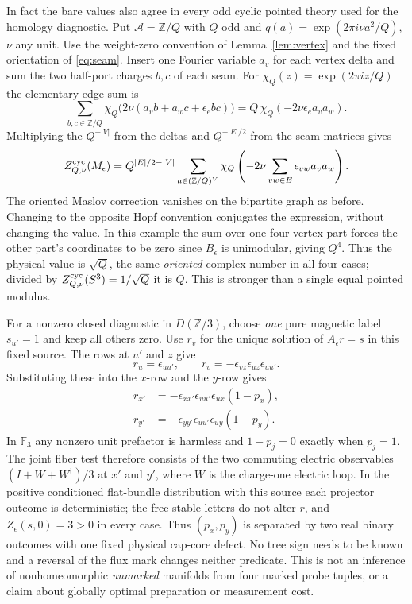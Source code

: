 \documentclass[11pt]{article}
\newcommand{\F}{\mathbb F_3}
\newcommand{\Z}{\mathbb Z}
\begin{document}
In fact the bare values also agree in every odd cyclic pointed theory used for the homology diagnostic. Put \(\mathcal A=\Z/Q\) with \(Q\) odd and \(q(a)=\exp(2\pi i \nu a^2/Q)\), \(\nu\) any unit. Use the weight-zero convention of Lemma~\ref{lem:vertex} and the fixed orientation of \eqref{eq:seam}. Insert one Fourier variable \(a_v\) for each vertex delta and sum the two half-port charges \(b,c\) of each seam. For \(\chi_Q(z)=\exp(2\pi i z/Q)\) the elementary edge sum is
\[
 \sum_{b,c\in\Z/Q}\chi_Q\big(2\nu(a_v b+a_w c+\epsilon_e bc)\big)
 =Q\,\chi_Q(-2\nu\epsilon_e a_v a_w).
\]
Multiplying the \(Q^{-|V|}\) from the deltas and \(Q^{-|E|/2}\) from the seam matrices gives
\begin{equation}
 Z_{Q,\nu}^{\rm cyc}(M_\epsilon)
 =Q^{|E|/2-|V|}\sum_{a\in(\Z/Q)^V}
             \chi_Q\left(-2\nu\sum_{vw\in E}\epsilon_{vw}a_v a_w\right).
 \label{eq:chibare}
\end{equation}
The oriented Maslov correction vanishes on the bipartite graph as before. Changing to the opposite Hopf convention conjugates the expression, without changing the value. In this example the sum over one four-vertex part forces the other part's coordinates to be zero since \(B_\epsilon\) is unimodular, giving \(Q^4\). Thus the physical value is \(\sqrt Q\), the same \emph{oriented} complex number in all four cases; divided by \(Z_{Q,\nu}^{\rm cyc}(S^3)=1/\sqrt Q\) it is \(Q\). This is stronger than a single equal pointed modulus.

For a nonzero closed diagnostic in \(D(\Z/3)\), choose \emph{one} pure magnetic label \(s_{u'}=1\) and keep all others zero. Use \(r_v\) for the unique solution of \(A_\epsilon r=s\) in this fixed source. The rows at \(u'\) and \(z\) give
\[
 r_u=\epsilon_{uu'},\qquad
 r_v=-\epsilon_{vz}\epsilon_{uz}\epsilon_{uu'} .
\]
Substituting these into the \(x\)-row and the \(y\)-row gives
\begin{align*}
 r_{x'}&=-\epsilon_{xx'}\epsilon_{uu'}\epsilon_{ux}(1-p_x),\\
 r_{y'}&=-\epsilon_{yy'}\epsilon_{uu'}\epsilon_{uy}(1-p_y).
\end{align*}
In \(\F\) any nonzero unit prefactor is harmless and \(1-p_j=0\) exactly when \(p_j=1\). The joint fiber test therefore consists of the two commuting electric observables \((I+W+W^\dagger)/3\) at \(x'\) and \(y'\), where \(W\) is the charge-one electric loop. In the positive conditioned flat-bundle distribution with this source each projector outcome is deterministic; the free stable letters do not alter \(r\), and \(Z_\epsilon(s,0)=3>0\) in every case. Thus \((p_x,p_y)\) is separated by two real binary outcomes with one fixed physical cap-core defect. No tree sign needs to be known and a reversal of the flux mark changes neither predicate. This is not an inference of nonhomeomorphic \emph{unmarked} manifolds from four marked probe tuples, or a claim about globally optimal preparation or measurement cost.
\end{document}
